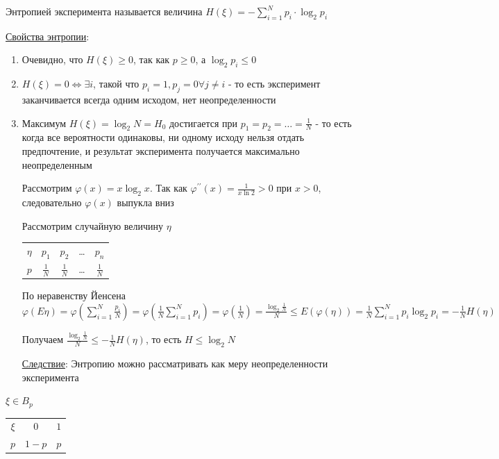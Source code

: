 \documentclass[12pt]{article}
\begin{document}
\Def Энтропией эксперимента называется величина $H(\xi) = -\sum_{i = 1}^N p_i \cdot \log_2 p_i$

\underline{Свойства энтропии}:

\begin{enumerate}
    \item Очевидно, что $H(\xi) \geq 0$, так как $p \geq 0$, а $\log_2 p_i \leq 0$
    
    \item $H(\xi) = 0 \Longleftrightarrow \exists i$, такой что $p_i = 1, p_j = 0 \forall j \neq i$ - то есть эксперимент заканчивается всегда одним исходом, нет неопределенности

    \item Максимум $H(\xi) = \log_2 N = H_0$ достигается при $p_1 = p_2 = \dots = \frac{1}{N}$ - то есть когда все вероятности одинаковы, ни одному исходу нельзя отдать предпочтение, и результат эксперимента получается максимально неопределенным

    \begin{MyProof}
        Рассмотрим $\varphi(x) = x \log_2 x$. Так как $\varphi^{\prime\prime}(x) = \frac{1}{x\ln 2} > 0$ при $x > 0$, следовательно $\varphi(x)$ выпукла вниз

        Рассмотрим случайную величину $\eta$

        \begin{tabular}{c|c|c|c|c}
            $\eta$ & $p_1$ & $p_2$ & \dots & $p_n$ \\
            \cline{1-6}
            $p$   & $\frac{1}{N}$ & $\frac{1}{N}$ & \dots & $\frac{1}{N}$
        \end{tabular}

        По неравенству Йенсена $\varphi(E\eta) = \varphi(\sum_{i = 1}^N \frac{p_i}{N}) = \varphi(\frac{1}{N} \sum_{i = 1}^N p_i) = 
        \varphi(\frac{1}{N}) = \frac{\log_2 \frac{1}{N}}{N} \leq E(\varphi(\eta)) = 
        \frac{1}{N} \sum_{i = 1}^N p_i \log_2 p_i = -\frac{1}{N} H(\eta)$

        Получаем $\frac{\log_2 \frac{1}{N}}{N} \leq -\frac{1}{N} H(\eta)$, то есть $H \leq \log_2 N$
    \end{MyProof}

    \underline{Следствие}: Энтропию можно рассматривать как меру неопределенности эксперимента
\end{enumerate}

\Ex $\xi \in B_{p}$

\begin{tabular}{c|c|c}
    $\xi$ & $0$ & $1$ \\
    \cline{1-6}
    $p$   & $1 - p$ & $p$
\end{tabular}
\end{document}
